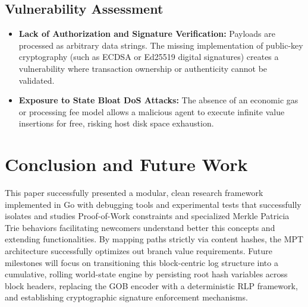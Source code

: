 \documentclass[10pt, conference]{IEEEtran}
\begin{document}
	\subsection{Vulnerability Assessment}
	\begin{itemize}
		\item \textbf{Lack of Authorization and Signature Verification:} Payloads are processed as arbitrary data strings. The missing implementation of public-key cryptography (such as ECDSA or Ed25519 digital signatures) creates a vulnerability where transaction ownership or authenticity cannot be validated.
		\item \textbf{Exposure to State Bloat DoS Attacks:} The absence of an economic gas or processing fee model allows a malicious agent to execute infinite value insertions for free, risking host disk space exhaustion.
	\end{itemize}
	
	\section{Conclusion and Future Work}
	This paper successfully presented a modular, clean research framework implemented in Go with debugging tools and experimental tests that successfully isolates and studies Proof-of-Work constraints and specialized Merkle Patricia Trie behaviors facilitating newcomers understand better this concepts and extending functionalities. By mapping paths strictly via content hashes, the MPT architecture successfully optimizes out branch value requirements. Future milestones will focus on transitioning this block-centric log structure into a cumulative, rolling world-state engine by persisting root hash variables across block headers, replacing the GOB encoder with a deterministic RLP framework, and establishing cryptographic signature enforcement mechanisms.
	
	
	
	
\end{document}
